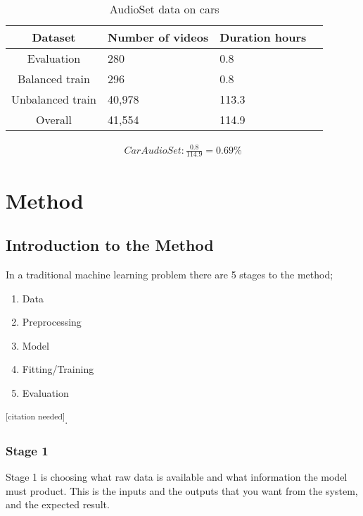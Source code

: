\documentclass{UoNMCHA}
\newcommand{\citationneeded}{\textsuperscript{\color{blue} [citation needed]}}
\numberwithin{equation}{section}
\begin{document}
\begin{table}[h!]
    \begin{center}
        \caption{AudioSet data on cars}\label{tab:AudioSetCars}
        {\footnotesize
            \begin{tabular}{c l l l|}
                \hline\hline Dataset & Number of videos & Duration hours \\ \hline 
                Evaluation & 280 & 0.8 \\
                Balanced train & 296 & 0.8 \\
                Unbalanced train & 40,978 & 113.3 \\
                Overall & 41,554 & 114.9 \\
                \hline
            \end{tabular}
        }
    \end{center}
\end{table}
\begin{gather*}
    Car AudioSet:  \frac{0.8}{114.9}=0.69\%
\end{gather*}

\section{Method}
\subsection{Introduction to the Method}
In a traditional machine learning problem there are 5 stages to the method; 

\begin{enumerate}[start=1,label={Stage \arabic*:}]
    \item Data
    \item Preprocessing
    \item Model
    \item Fitting/Training
    \item Evaluation
\end{enumerate}

\citationneeded.

\subsubsection{Stage 1}
Stage 1 is choosing what raw data is available and what information the model must product. This is the inputs and the outputs that you want from the system, and the expected result.
\end{document}
